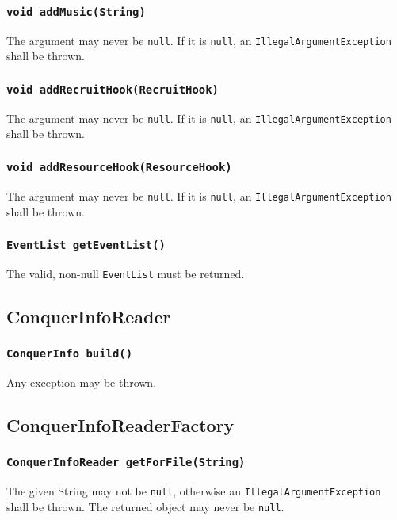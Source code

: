 \documentclass{article}
\begin{document}
\subsubsection{\texttt{void addMusic(String)}}
The argument may never be \texttt{null}. If it is \texttt{null}, an \texttt{IllegalArgumentException}
shall be thrown.

\subsubsection{\texttt{void addRecruitHook(RecruitHook)}}
The argument may never be \texttt{null}. If it is \texttt{null}, an \texttt{IllegalArgumentException}
shall be thrown.

\subsubsection{\texttt{void addResourceHook(ResourceHook)}}
The argument may never be \texttt{null}. If it is \texttt{null}, an \texttt{IllegalArgumentException}
shall be thrown.

\subsubsection{\texttt{EventList getEventList()}}
The valid, non-null \texttt{EventList} must be returned.

\subsection{ConquerInfoReader}

\subsubsection{\texttt{ConquerInfo build()}}

Any exception may be thrown. 

\subsection{ConquerInfoReaderFactory}

\subsubsection{\texttt{ConquerInfoReader getForFile(String)}}

The given String may not be \texttt{null}, otherwise an \texttt{IllegalArgumentException} shall be thrown.
The returned object may never be \texttt{null}.
\end{document}
